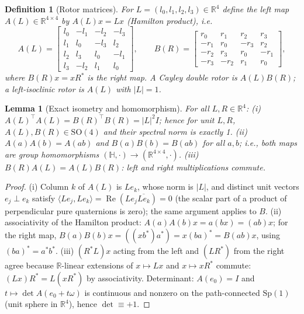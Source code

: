 \documentclass{article}
\newtheorem{lemma}{Lemma}
\newtheorem{definition}{Definition}
\newcommand{\R}{\mathbb{R}}
\newcommand{\SO}{\mathrm{SO}}
\newcommand{\Sp}{\mathrm{Sp}}
\newcommand{\inner}[2]{\langle #1, #2 \rangle}
\begin{document}
\begin{definition}[Rotor matrices]
\label{def:rotor}
For $L=(l_0,l_1,l_2,l_3)\in\R^4$ define the \emph{left} map
$A(L)\in\R^{4\times4}$ by $A(L)x=Lx$ (Hamilton product), i.e.
\[
A(L)=\begin{bmatrix}
 l_0&-l_1&-l_2&-l_3\\
 l_1& l_0&-l_3& l_2\\
 l_2& l_3& l_0&-l_1\\
 l_3&-l_2& l_1& l_0
\end{bmatrix},
\qquad
B(R)=\begin{bmatrix}
 r_0& r_1& r_2& r_3\\
-r_1& r_0&-r_3& r_2\\
-r_2& r_3& r_0&-r_1\\
-r_3&-r_2& r_1& r_0
\end{bmatrix},
\]
where $B(R)x=xR^{*}$ is the \emph{right} map. A \emph{Cayley double rotor} is
$A(L)B(R)$; a \emph{left-isoclinic rotor} is $A(L)$ with $|L|=1$.
\end{definition}

\begin{lemma}[Exact isometry and homomorphism]
\label{lem:iso}
For all $L,R\in\R^4$: (i) $A(L)^\top A(L)=B(R)^\top B(R)=|L|^2I$; hence for
unit $L,R$, $A(L),B(R)\in\SO(4)$ and their spectral norm is exactly 1.
(ii) $A(a)A(b)=A(ab)$ and $B(a)B(b)=B(ab)$ for all $a,b$; i.e., both maps are
group homomorphisms $(\mathbb{H},\cdot)\to(\R^{4\times4},\cdot)$. (iii)
$B(R)A(L)=A(L)B(R)$: left and right multiplications commute.
\end{lemma}

\begin{proof}
(i) Column $k$ of $A(L)$ is $Le_k$, whose norm is $|L|$, and distinct unit
vectors $e_j\perp e_k$ satisfy $\inner{Le_j}{Le_k}=\operatorname{Re}(Le_j\overline{Le_k})=0$
(the scalar part of a product of perpendicular pure quaternions is zero); the
same argument applies to $B$. (ii) associativity of the Hamilton product:
$A(a)A(b)x=a(bx)=(ab)x$; for the right map,
$B(a)B(b)x=((xb^{*})a^{*})=x(ba)^{*}=B(ab)x$, using
$(ba)^{*}=a^{*}b^{*}$. (iii) $(R^{*}L)x$ acting from the left and
$(LR^{*})$ from the right agree because $\R$-linear extensions of
$x\mapsto Lx$ and $x\mapsto xR^{*}$ commute: $(Lx)R^{*}=L(xR^{*})$ by
associativity. Determinant: $A(e_0)=I$ and $t\mapsto\det A(e_0+t\omega)$ is
continuous and nonzero on the path-connected $\Sp(1)$ (unit sphere in $\R^4$),
hence $\det\equiv+1$.
\end{proof}
\end{document}
